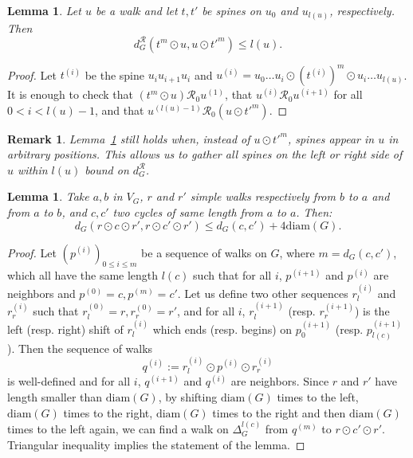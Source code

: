 \documentclass{article}
\newtheorem{lemma}[theorem]{Lemma}
\newtheorem{remark}[theorem]{Remark}
\begin{document}
\begin{lemma}\label{lemma:movingbacktracks}
Let $u$ be a walk and let $t, t'$ be spines on $u_0$ and $u_{l(u)}$, respectively. Then
\[
d^{\mathcal{R}}_G(t^m\odot u, u\odot t'^m) \le l(u).
\]
\end{lemma}


\begin{proof}
Let $t^{(i)}$ be the spine $u_iu_{i+1}u_i$ and $u^{(i)} = u_0\dots u_i \odot \left(t^{(i)}\right)^m \odot u_i\dots u_{l(u)}$. It is enough to check that $(t^m \odot u) \mathcal{R}_0 u^{(1)}$, that $u^{(i)} \mathcal{R}_0 u^{(i+1)}$ for all $0<i<l(u)-1$, and that $u^{(l(u)-1)} \mathcal{R}_0 (u \odot t'^m)$.
\end{proof}

\begin{remark}
Lemma~\ref{lemma:movingbacktracks} still holds when, instead of $u\odot t'^m$, spines appear in $u$ in arbitrary positions. This allows us to gather all spines on the left or right side of $u$ within $l(u)$ bound on $d^{\mathcal{R}}_G$.
\end{remark}

\begin{lemma}\label{lemma:extension}
Take $a,b$ in $V_G$, $r$ and $r'$ simple walks respectively from $b$ to $a$ and from $a$ to $b$, and $c, c'$ two cycles of same length from $a$ to $a$. Then:
\[d_G(r\odot c \odot r',r\odot c' \odot r') \le d_G(c,c') + 4 \text{diam}(G).\]
\end{lemma} 

\begin{proof}
Let $\left(p^{(i)}\right)_{0\le i \le m}$ be a sequence of walks on $G$, where $m=d_G(c,c')$, which all have the same 
length $l(c)$ such that for all $i$, $p^{(i+1)}$ and $p^{(i)}$ are neighbors 
and $p^{(0)}=c,p^{(m)}=c'$. Let us define two other sequences $r_l^{(i)}$ and 
$r_r^{(i)}$ such that $r_l^{(0)} = r, r_r^{(0)}=r'$, and for all $i$, 
$r_l^{(i+1)}$ (resp. $r_r^{(i+1)}$) is the left (resp. right) shift of $r_l^{(i)}$ which ends (resp. begins) on $p^{(i+1)}_0$ (resp. $p^{(i+1)}_{l(c)}$). Then the sequence of walks 
\[q^{(i)} := r_l^{(i)} \odot p^{(i)} \odot r_r^{(i)}\]
is well-defined and for all $i$, $q^{(i+1)}$ and $q^{(i)}$ are neighbors.
Since $r$ and $r'$ have length smaller than $\text{diam}(G)$, 
by shifting $\text{diam}(G)$ times to the left, $\text{diam}(G)$ times to the right, $\text{diam}(G)$ times to the right and then $\text{diam}(G)$ times to the left again, we can find a walk on $\Delta_G^{l(c)}$ from $q^{(m)}$ to $r\odot c' \odot r'$. Triangular inequality implies the statement of the lemma.
\end{proof}
\end{document}
